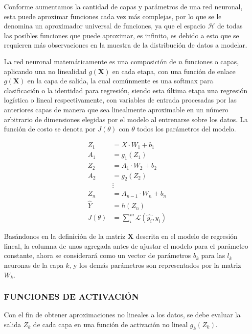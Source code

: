         Conforme aumentamos la cantidad de capas y parámetros de una red neuronal, esta puede aproximar funciones cada vez más complejas, por lo que se le denomina un aproximador universal de funciones, ya que el espacio $\mathcal{H}$ de todas las posibles funciones que puede aproximar, es infinito, es debido a esto que se requieren más observaciones en la muestra de la distribución de datos a modelar. \citep{Goodfellow-et-al-2016}
        
        La red neuronal matemáticamente es una composición de $n$ funciones o capas, aplicando una no linealidad $g(\mathbf{X})$ en cada etapa, con una función de enlace $g(\mathbf{X})$ en la capa de salida, la cual comúnmente es una softmax para clasificación o la identidad para regresión, siendo esta última etapa una regresión logística o lineal respectivamente, con variables de entrada procesadas por las anteriores capas de manera que sea linealmente aproximable en un número arbitrario de dimensiones elegidas por el modelo al entrenarse sobre los datos. La función de costo se denota por $J(\theta)$ con $\theta$ todos los parámetros del modelo. \citep{bishop}
        
        \begin{equation}
        \begin{aligned}
            Z_1 &= X \cdot W_1 + b_1\\
    		A_1 &= g_1(Z_1) \\
    		Z_2 &= A_1 \cdot W_2 + b_2 \\
    		A_2 &= g_2(Z_2) \\
    		&\vdots\\
    		Z_n &= A_{n-1} \cdot W_n + b_n\\
    		\hat{Y} &= h(Z_n) \\
    		J(\theta) &= \sum_{i}^{m} \mathcal{L}(\hat{y_i}, y_i)
        \end{aligned}
        \end{equation}
        
        Basándonos en la definición de la matriz $\mathbf{X}$ descrita en el modelo de regresión lineal, la columna de unos agregada antes de ajustar el modelo para el parámetro constante, ahora se considerará como un vector de parámetros $b_k$ para las $l_k$ neuronas de la capa $k$, y los demás parámetros son representados por la matriz $W_k$.
        
        \subsubsection{FUNCIONES DE ACTIVACIÓN}
        Con el fin de obtener aproximaciones no lineales a los datos, se debe evaluar la salida $Z_k$ de cada capa en una función de activación no lineal $g_k(Z_k)$.
        
